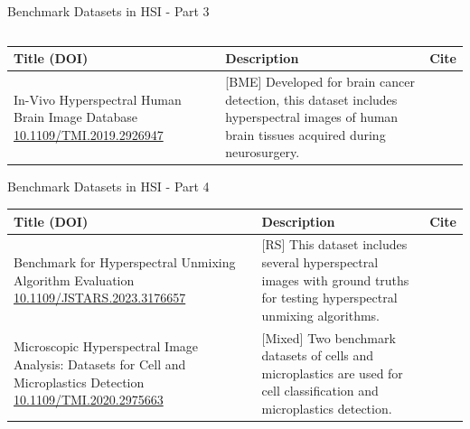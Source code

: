\documentclass[10pt,svgnames,fragile]{beamer}
\begin{document}
\begin{frame}{Benchmark Datasets in HSI - Part 3}
\begin{figure}
\begin{columns}[T]
\begin{column}{0.62\textwidth}
        \end{column}
    \end{columns}
    \label{fig:In-Vivo}
\end{figure}
\vspace{-1cm} %
\begin{table}[]
    \centering
    \begin{tabular}{|p{4.5cm}|p{6cm}|p{0.5cm}|}
        \hline
        \textbf{Title (DOI)} & \textbf{Description} & \textbf{Cite} \\ \hline
        In-Vivo Hyperspectral Human Brain Image Database \newline \href{https://consensus.app/papers/invivo-hyperspectral-human-brain-image-database-brain-fabelo/14753e1e2ea15718be292f660ad9ec53/?utm_source=chatgpt}{\color{blue}10.1109/TMI.2019.2926947} & [BME] Developed for brain cancer detection, this dataset includes hyperspectral images of human brain tissues acquired during neurosurgery. & \cite{fabeloInVivoHyperspectralHuman2019} \\ \hline
    \end{tabular}
\end{table}
\end{frame}

\begin{frame}{Benchmark Datasets in HSI - Part 4}
\small
\begin{table}[]
    \centering
    \begin{tabular}{|p{4.5cm}|p{6cm}|p{0.5cm}|}
        \hline
        \textbf{Title (DOI)} & \textbf{Description} & \textbf{Cite} \\ \hline
        Benchmark for Hyperspectral Unmixing Algorithm Evaluation \newline \href{https://consensus.app/papers/benchmark-hyperspectral-unmixing-algorithm-evaluation-paura/46070bf6345059e99d77d14e4dadef27/?utm_source=chatgpt}{\color{blue}10.1109/JSTARS.2023.3176657} & [RS] This dataset includes several hyperspectral images with ground truths for testing hyperspectral unmixing algorithms. & \cite{pauraBenchmarkHyperspectralUnmixing2023} \\ \hline
        Microscopic Hyperspectral Image Analysis: Datasets for Cell and Microplastics Detection \newline \href{https://consensus.app/papers/microscopic-hyperspectral-image-analysis-deep-learning-chen/aaa2e55a0cd357e6bd6615d6683789c3/?utm_source=chatgpt}{\color{blue}10.1109/TMI.2020.2975663} & [Mixed] Two benchmark datasets of cells and microplastics are used for cell classification and microplastics detection. & \cite{chenMicroscopicHyperspectralImage2020} \\ \hline
    \end{tabular}
\end{table}
\end{frame}
\end{document}

